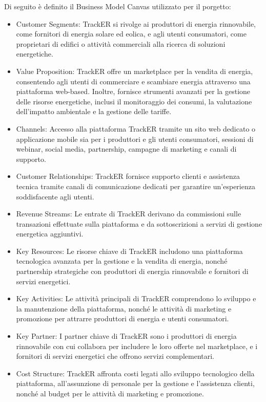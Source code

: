 \documentclass[oneside]{book}
\begin{document}
Di seguito è definito il Business Model Canvas utilizzato per il porgetto:

\begin{itemize}
    \item Customer Segments: TrackER si rivolge ai produttori di energia rinnovabile, come fornitori di energia solare ed eolica, e agli utenti consumatori, come proprietari di edifici o attività commerciali alla ricerca di soluzioni energetiche.
    \item Value Proposition: TrackER offre un marketplace per la vendita di energia, consentendo agli utenti di commerciare e scambiare energia attraverso una piattaforma web-based. Inoltre, fornisce strumenti avanzati per la gestione delle risorse energetiche, inclusi il monitoraggio dei consumi, la valutazione dell'impatto ambientale e la gestione delle tariffe.
    \item Channels: Accesso alla piattaforma TrackER tramite un sito web dedicato o applicazione mobile sia per i produttori e gli utenti consumatori, sessioni di webinar, social media, partnership, campagne di marketing e canali di supporto.
    \item Customer Relationships: TrackER fornisce supporto clienti e assistenza tecnica tramite canali di comunicazione dedicati per garantire un'esperienza soddisfacente agli utenti.
    \item Revenue Streams: Le entrate di TrackER derivano da commissioni sulle transazioni effettuate sulla piattaforma e da sottoscrizioni a servizi di gestione energetica aggiuntivi.
    \item Key Resources: Le risorse chiave di TrackER includono una piattaforma tecnologica avanzata per la gestione e la vendita di energia, nonché partnership strategiche con produttori di energia rinnovabile e fornitori di servizi energetici.
    \item Key Activities: Le attività principali di TrackER comprendono lo sviluppo e la manutenzione della piattaforma, nonché le attività di marketing e promozione per attrarre produttori di energia e utenti consumatori.
    \item Key Partner:  I partner chiave di TrackER sono i produttori di energia rinnovabile con cui collabora per includere le loro offerte nel marketplace, e i fornitori di servizi energetici che offrono servizi complementari.
    \item Cost Structure: TrackER affronta costi legati allo sviluppo tecnologico della piattaforma, all'assunzione di personale per la gestione e l'assistenza clienti, nonché al budget per le attività di marketing e promozione.
\end{itemize}
\end{document}
